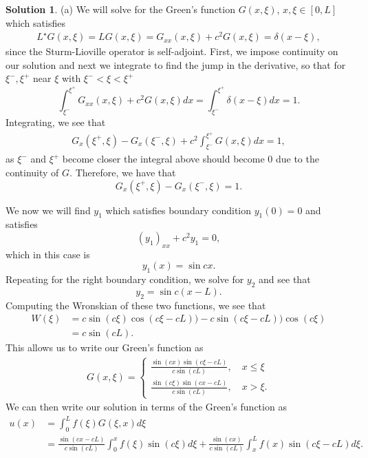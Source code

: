 \documentclass[12pt]{article}
\theoremstyle{definition}
\newtheorem{sol}{Solution}
\theoremstyle{remark}
\begin{document}
\begin{sol}
    (a) We will solve for the Green's function $G(x, \xi)$, $x,\xi \in [0,L]$ which satisfies
    \begin{align*}
        L^{\star} G(x, \xi) = L G(x, \xi) = G_{xx}(x, \xi) + c^{2} G(x, \xi) = \delta(x - \xi),
    \end{align*}
    since the Sturm-Lioville operator is self-adjoint. First, we impose continuity on our solution and next we integrate to find the jump in the derivative, so that for $\xi^{-}, \xi^{+}$ near $\xi$ with $\xi^{-} < \xi < \xi^{+}$ 
    \begin{equation*}
        \int_{\xi^{-}}^{\xi^{+}} G_{xx}(x, \xi) + c^{2} G(x, \xi) dx = \int_{\xi^{-}}^{\xi^{+}} \delta(x - \xi) dx = 1.
    \end{equation*}
    Integrating, we see that
    \begin{align*}
        G_{x}(\xi^{+}, \xi) - G_{x}(\xi^{-}, \xi) + c^{2} \int_{\xi^{-}}^{\xi^{+}} G(x, \xi) dx = 1,
    \end{align*}
    as $\xi^{-}$ and $\xi^{+}$ become closer the integral above should become 0 due to the continuity of $G$. Therefore, we have that
    \begin{equation*}
        G_{x}(\xi^{+}, \xi) - G_{x}(\xi^{-}, \xi)  = 1.
    \end{equation*}
\end{sol}
We now we will find $y_{1}$ which satisfies boundary condition $y_{1}(0) = 0$ and satisfies
\begin{equation*}
    (y_{1})_{xx} + c^{2}y_{1} = 0,
\end{equation*}
which in this case is 
\begin{equation*}
    y_{1}(x) = \sin cx.
\end{equation*}
Repeating for the right boundary condition, we solve for $y_{2}$ and see that
\begin{equation*}
    y_{2} =  \sin c(x - L).
\end{equation*}
Computing the Wronskian of these two functions, we see that
\begin{align*}
    W(\xi) &= c \sin(c\xi) \cos(c\xi - cL)) - c\sin(c\xi - cL)) \cos(c\xi)\\
           &= c \sin(cL).
\end{align*}
This allows us to write our Green's function as 
\begin{align*}
    G(x, \xi) = 
    \begin{cases}
        \frac{\sin(cx)\sin(c\xi - cL)}{c\sin(cL)}, \quad x \leq \xi\\
        \frac{\sin(c\xi)\sin(cx - cL)}{c\sin(cL)}, \quad x > \xi.
    \end{cases}
\end{align*}
We can then write our solution in terms of the Green's function as
\begin{align*}
    u(x) &= \int_{0}^{L} f(\xi) G(\xi, x) d\xi\\
         &= \frac{\sin(cx - cL)}{c\sin(cL)} \int_{0}^{x} f(\xi)\sin(c\xi) d\xi +    \frac{\sin(cx)}{c\sin(cL)} \int_{x}^{L} f(x) \sin(c\xi - cL)d\xi.
\end{align*}
\end{document}
